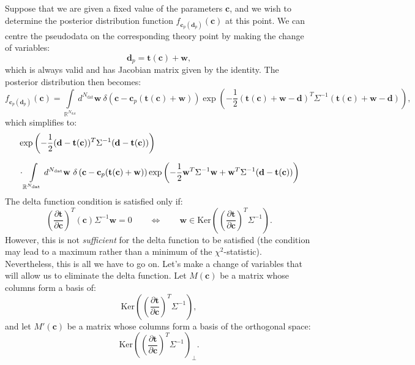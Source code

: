 \documentclass[withindex,glossary]{cam-thesis}
\renewcommand{\vec}[1]{\textbf{#1}} %
\begin{document}
Suppose that we are given a fixed value of the parameters $\vec{c}$, and we wish to determine the posterior distribution function $f_{\vec{c}_p(\vec{d}_p)}(\vec{c})$ at this point. We can centre the pseudodata on the corresponding theory point by making the change of variables:
\begin{equation}
\vec{d}_p = \vec{t}(\vec{c}) + \vec{w},
\end{equation}
which is always valid and has Jacobian matrix given by the identity. The posterior distribution then becomes:
\begin{equation}
f_{\vec{c}_p(\vec{d}_p)}(\vec{c}) = \int\limits_{\mathbb{R}^{N_{\text{dat}}}} d^{N_{\text{dat}}}\vec{w}\ \delta\left(\vec{c} - \vec{c}_p(\vec{t}(\vec{c}) + \vec{w}) \right) \exp\left( -\frac{1}{2} (\vec{t}(\vec{c}) + \vec{w} - \vec{d})^T \Sigma^{-1} (\vec{t}(\vec{c}) + \vec{w} - \vec{d}) \right),
\end{equation}
which simplifies to:
\begin{align}
& \exp\left( -\frac{1}{2}(\vec{d} - \vec{t}(\vec{c}))^T\Sigma^{-1} (\vec{d} - \vec{t}(\vec{c})) \right)\notag\\[1.5ex]
& \cdot \int\limits_{\mathbb{R}^{N_{\text{dat}}}} d^{N_{\text{dat}}}\vec{w}\ \delta\left(\vec{c} - \vec{c}_p(\vec{t}(\vec{c}) + \vec{w}) \right) \exp\left( -\frac{1}{2} \vec{w}^T \Sigma^{-1} \vec{w} + \vec{w}^T \Sigma^{-1} (\vec{d} - \vec{t}(\vec{c})) \right)
\end{align}
The delta function condition is satisfied only if:
\begin{equation}
\left( \frac{\partial \vec{t}}{\partial \vec{c}} \right)^T (\vec{c}) \Sigma^{-1} \vec{w} = 0 \qquad \Leftrightarrow \qquad \vec{w} \in \textrm{Ker}\left( \left( \frac{\partial \vec{t}}{\partial \vec{c}} \right)^T \Sigma^{-1} \right).
\end{equation}
However, this is not \textit{sufficient} for the delta function to be satisfied (the condition may lead to a maximum rather than a minimum of the $\chi^2$-statistic). Nevertheless, this is all we have to go on. Let's make a change of variables that will allow us to eliminate the delta function. Let $M(\vec{c})$ be a matrix whose columns form a basis of:
\begin{equation}
\textrm{Ker}\left( \left( \frac{\partial \vec{t}}{\partial \vec{c}} \right)^T \Sigma^{-1} \right),
\end{equation}
and let $M'(\vec{c})$ be a matrix whose columns form a basis of the orthogonal space:
\begin{equation}
\textrm{Ker}\left( \left( \frac{\partial \vec{t}}{\partial \vec{c}} \right)^T \Sigma^{-1} \right)_{\perp}.
\end{equation}
\end{document}
